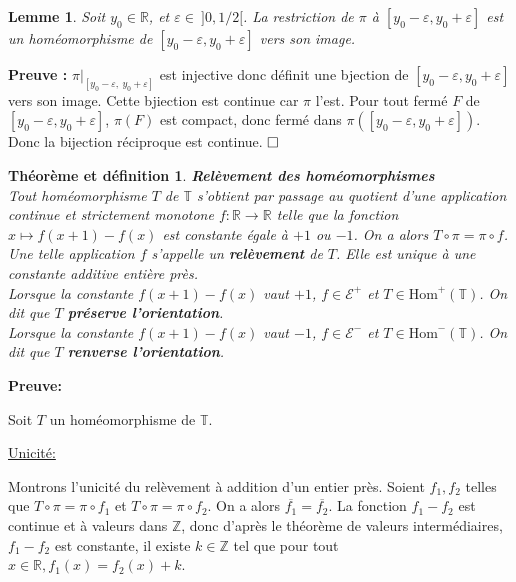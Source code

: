 \documentclass[11pt,a4 paper]{article}
\newtheorem{lemme}[theoreme]{Lemme}
\newtheorem{thmetdefinition}[theoreme]{Théorème et définition}
\newcommand{\Tbb}{\mathbb{T}}
\newcommand{\Rbb}{\mathbb{R}}
\newenvironment{thmdefi}{\begin{box_thmdefi}\begin{thmetdefinition}}{\end{thmetdefinition}\end{box_thmdefi}}
\newenvironment{lm}{\begin{box_lm}\begin{lemme}}{\end{lemme}\end{box_lm}}
\begin{document}
\begin{lm}\label{préli relèvement}
	Soit $y_0 \in \Rbb$, et $\varepsilon \in \ ]0,1/2[$. La restriction de $\pi$ à $[y_0-\varepsilon, y_0 +\varepsilon]$ est un homéomorphisme de $[y_0-\varepsilon, y_0 +\varepsilon]$ vers son image.
\end{lm}

	\textbf{Preuve :}
	$\pi|_{[y_0-\varepsilon,\ y_0 +\varepsilon]}$ est injective donc définit une bjection de $[y_0-\varepsilon, y_0 +\varepsilon]$ vers son image. Cette bjiection est continue car $\pi$ l'est. Pour tout fermé $F$ de $[y_0-\varepsilon, y_0 +\varepsilon]$, $\pi(F)$ est compact, donc fermé dans $\pi([y_0-\varepsilon, y_0 +\varepsilon])$. Donc la bijection réciproque est continue. $\hfill \square$\\






\begin{thmdefi}\label{relèvement des homémorphismes} \textbf{Relèvement des homéomorphismes}\\
	Tout homéomorphisme $T$ de $\Tbb$ s'obtient par passage au quotient d'une application continue et strictement monotone $f:\mathbb{R} \to \mathbb{R}$ telle que la fonction $x \mapsto f(x+1) -f(x)$ est constante égale à $+1$ ou $-1$. On a alors $T \circ \pi = \pi \circ f$. Une telle application $f$ s'appelle un \textbf{relèvement} de $T$. Elle est unique à une constante additive entière près.\\
	Lorsque la constante $f(x+1)-f(x)$ vaut $+1$, $f \in \mathcal{E}^+$ et $T \in \mathrm{Hom}^+(\Tbb)$. On dit que $T$ \textbf{préserve l'orientation}.\\
	Lorsque la constante $f(x+1)-f(x)$ vaut $-1$, $f \in \mathcal{E}^-$ et $T \in \mathrm{Hom}^-(\Tbb)$. On dit que $T$ \textbf{renverse l'orientation}.
\end{thmdefi}

	\textbf{Preuve:}
	\par Soit $T$ un homéomorphisme de $\Tbb$.
	\par \underline{Unicité:} 
	\par Montrons l'unicité du relèvement à addition d'un entier près. Soient $f_1, f_2$ telles que $T \circ \pi = \pi \circ f_1$ et $T \circ \pi = \pi \circ f_2$. On a alors $\overline{f_1}=\overline{f_2}$. La fonction $f_1 - f_2$ est continue et à valeurs dans $\mathbb{Z}$, donc d'après le théorème de valeurs intermédiaires, $f_1 - f_2$ est constante, il existe $k \in \mathbb{Z}$ tel que pour tout $x \in \mathbb{R}, f_1(x)=f_2(x)+k$.\\
	
\end{document}
